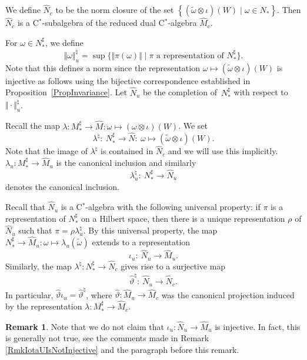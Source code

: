 \documentclass[11pt]{article}
\numberwithin{equation}{section}
\theoremstyle{definition}
\newtheorem{rmk}[thm]{Remark}
\begin{document}
We def\/ine $\hat{N}_c$ to be the norm closure of the set $\left\{ (\tilde{\omega} \otimes \iota)(W) \mid \omega \in N_\ast \right\}$. Then $\hat{N}_c$ is a C$^\ast$-subalgebra of the reduced dual C$^\ast$-algebra $\hat{M}_c$.

 For $\omega \in N_\ast^\sharp$, we def\/ine
\[
    \Vert \omega \Vert_u^\natural = \sup \big\{ \Vert \pi(\omega) \Vert \mid \pi \textrm{ a representation of } N_\ast^\sharp  \big\}.
\]
Note that this def\/ines a norm since the representation $\omega \mapsto (\tilde{\omega} \otimes \iota)(W)$ is injective as follows using the bijective correspondence established in Proposition~\ref{PropInvariance}.
 Let $\hat{N}_u$ be the completion of~$N_\ast^\sharp$ with respect to~$\Vert \cdot \Vert_u^\natural$.



Recall the map $\lambda: M_\ast^\sharp \rightarrow \hat{M}: \omega \mapsto (\omega \otimes \iota)(W)$. We set
\[
\lambda^\natural: \ N_\ast^\sharp \rightarrow \hat{N}: \ \omega \mapsto (\tilde{\omega} \otimes \iota)(W).
\]
  Note that the image of $\lambda^\natural$ is contained in $\hat{N}_c$ and we will use this implicitly. $\lambda_u: M_\ast^\sharp \rightarrow \hat{M}_u$ is the canonical inclusion and similarly
\[
\lambda_u^\natural: \ N_\ast^\sharp \rightarrow \hat{N}_u
\]
 denotes the canonical inclusion.

Recall that $\hat{N}_u$ is a C$^\ast$-algebra with the following universal property: if $\pi$ is a representation of $N_\ast^\sharp$ on a Hilbert space, then there is a unique representation $\rho$ of $\hat{N}_u$ such that $\pi = \rho \lambda_u^\natural$.  By this universal property, the map $N_\ast^\sharp \rightarrow \hat{M}_u: \omega \mapsto \lambda_u(\tilde{\omega}) $ extends to a representation
\[
\iota_u: \ \hat{N}_u \rightarrow \hat{M}_u.
\]
  Similarly, the map $\lambda^\natural: N_\ast^\sharp \rightarrow \hat{N}_c$ gives rise to a surjective map
 \[
\hat{\vartheta}^\natural: \ \hat{N}_u \rightarrow \hat{N}_c.
\]
 In particular, $\hat{\vartheta} \iota_u = \hat{\vartheta}^\natural$, where $\hat{\vartheta}: \hat{M}_u \rightarrow \hat{M}_c$ was the canonical projection induced by the representation $\lambda: M_\ast^\sharp \rightarrow \hat{M}_c$.

\begin{rmk}
Note that we do not claim that $\iota_u: \hat{N}_u \rightarrow \hat{M}_u$ is injective. In fact, this is generally not true, see the comments made in Remark \ref{RmkIotaUIsNotInjective} and the paragraph before this remark.
\end{rmk}
\end{document}
